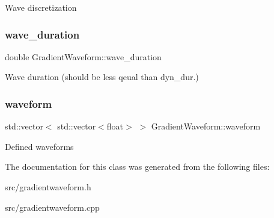 Wave discretization \mbox{\label{class_gradient_waveform_a02d695fa36713bd28d3c85d2bb7a877b}} 
\subsubsection{\texorpdfstring{wave\+\_\+duration}{wave\_duration}}
{\footnotesize\ttfamily double Gradient\+Waveform\+::wave\+\_\+duration}

Wave duration (should be less qeual than dyn\+\_\+dur.) \mbox{\label{class_gradient_waveform_a565fce08abb28fe26664194c04faeaea}} 
\subsubsection{\texorpdfstring{waveform}{waveform}}
{\footnotesize\ttfamily std\+::vector$<$ std\+::vector$<$float$>$ $>$ Gradient\+Waveform\+::waveform}

Defined waveforms 

The documentation for this class was generated from the following files\+:\begin{DoxyCompactItemize}
\item 
src/gradientwaveform.\+h\item 
src/gradientwaveform.\+cpp\end{DoxyCompactItemize}

